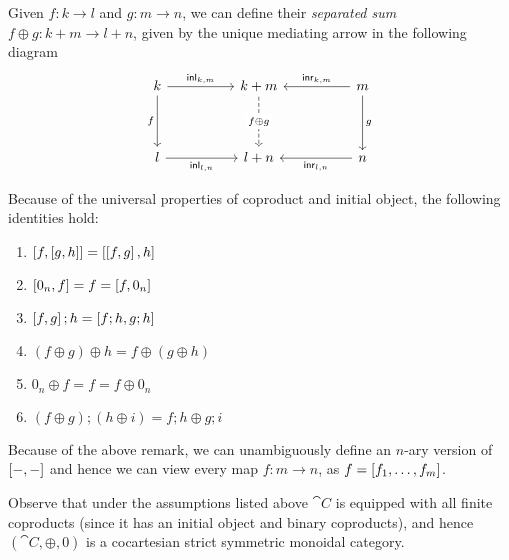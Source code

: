 Given $f \colon k \to l$ and $g \colon m \to n$, we can define their \emph{separated sum} $f \oplus g \colon k + m \to l + n $, given by the unique mediating arrow in the following diagram
\begin{equation}\begin{tikzcd}\label{eqn:monoidal}
	k && {k + m} && m \\
	\\
	l && {l + n} && n
	\arrow["\inl_{k,m}", from=1-1, to=1-3]
	\arrow["f"', from=1-1, to=3-1]
	\arrow["{f \oplus g}"{description}, dashed, from=1-3, to=3-3]
	\arrow["\inr_{k,m}"', from=1-5, to=1-3]
	\arrow["g", from=1-5, to=3-5]
	\arrow["\inl_{l,n}"', from=3-1, to=3-3]
	\arrow["\inr_{l,n}", from=3-5, to=3-3]
\end{tikzcd}\end{equation}
\begin{remark}
	Because of the universal properties of coproduct and initial object, the following identities hold:
	\begin{enumerate}
		\item $\left[ f , \left[ g , h \right] \right] = \left[ \left[ f , g \right], h \right]$
		\item $\left[ 0_n, f \right] = f = \left[ f , 0_n \right]$
		\item $\left[ f , g \right] ; h = \left[ f ; h , g ; h \right]$
		\item $(f \oplus g) \oplus h = f \oplus (g \oplus h )$
		\item $0_n \oplus f = f = f \oplus 0_n$
		\item $(f \oplus g) ; (h \oplus i) = f ; h \oplus g;i$
	\end{enumerate}
\end{remark}
Because of the above remark, we can unambiguously define an $n$-ary version of $\left[ -, -\right]$ and hence we can view every map $f \colon m \to n$, as $f = \left[ f_1, \dots, f_m\right]$.

Observe that under the assumptions listed above $\cat{C}$ is equipped with all finite coproducts (since it has an initial object and binary coproducts), and hence $(\cat{C}, \oplus , 0 )$ is a cocartesian strict symmetric monoidal category. 

